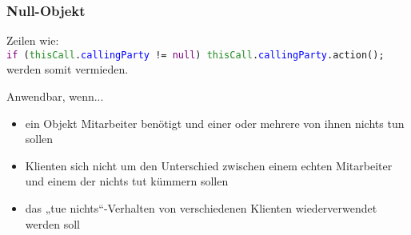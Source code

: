 \subsubsection{Null-Objekt}
Zeilen wie:\\
\texttt{\textcolor{purple}{if} (\textcolor{ForestGreen}{thisCall}.\textcolor{blue}{callingParty} != \textcolor{purple}{null}) \textcolor{ForestGreen}{thisCall}.\textcolor{blue}{callingParty}.action();}\\
werden somit vermieden.\\

Anwendbar, wenn...
\begin{itemize}
    \item ein Objekt Mitarbeiter benötigt und einer oder mehrere von ihnen nichts tun sollen
    \item Klienten sich nicht um den Unterschied zwischen einem echten Mitarbeiter und einem der nichts tut kümmern sollen
    \item das „tue nichts“-Verhalten von verschiedenen Klienten wiederverwendet werden soll
\end{itemize}